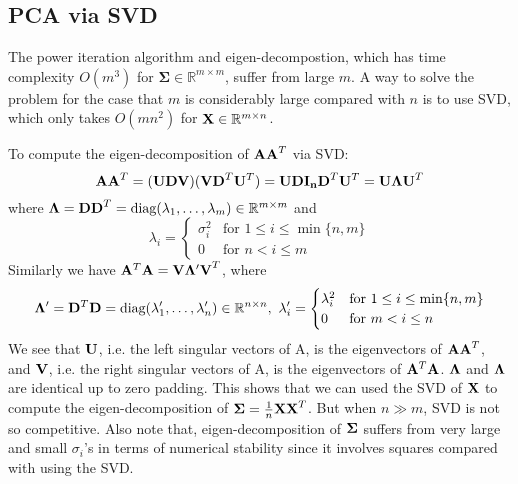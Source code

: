 \documentclass[../book-template.tex]{subfiles}
\begin{document}
\subsection{PCA via SVD}
The power iteration algorithm and eigen-decompostion, which has time complexity $O(m^3)$ for $\bm{\Sigma}\in\mathbb{R}^{m\times m}$, suffer from large $m$. A way to solve the problem for the case that $m$ is considerably large compared with $n$ is to use SVD, which only takes $O(mn^2)$ for ${\bf X}\in \mathbb{R}^{m\times n}$.
\par To compute the eigen-decomposition of ${\bf AA}^T$ via SVD:
\begin{equation*}
    {\bf AA}^T = ({\bf UDV})({\bf VD}^T{\bf U}^T) = {\bf UDI_nD}^T{\bf U}^T = {\bf U\Lambda U}^T
\end{equation*}
where ${\bf \Lambda} = {\bf DD}^T=\text{diag}(\lambda_1,\dots,\lambda_m)\in\mathbb{R}^{m\times m}$ and
\begin{equation*}
\lambda_i=\begin{cases}
\sigma_i^2& \text{for }1\leq i \leq \min\{n,m\}\\
0& \text{for }n< i \leq m
\end{cases}
\end{equation*}
Similarly we have ${\bf A}^T{\bf A}={\bf V\Lambda'V}^T$, where
\begin{equation*}
    {\bf \Lambda'} = {\bf D}^T{\bf D} = \text{diag}(\lambda'_1,\dots,\lambda'_n)\in\mathbb{R}^{n\times n},\ \lambda'_i=\begin{cases}
\lambda_i^2& \text{for }1\leq i \leq \min\{n,m\}\\
0& \text{for }m< i \leq n
\end{cases}
\end{equation*}
We see that ${\bf U}$, i.e. the left singular vectors of A, is the eigenvectors of ${\bf AA}^T$, and ${\bf V}$, i.e. the right singular vectors of A, is the eigenvectors of ${\bf A}^T{\bf A}$. ${\bf \Lambda}$ and ${\bf \Lambda}$ are identical up to zero padding. This shows that we can used the SVD of ${\bf X}$ to compute the eigen-decomposition of ${\bf \Sigma}=\frac{1}{n}{\bf XX}^T$. But when $n \gg m$, SVD is not so competitive. Also note that, eigen-decomposition of ${\bf \Sigma}$ suffers from very large and small $\sigma_i$'s in terms of numerical stability since it involves squares compared with using the SVD.
\end{document}
